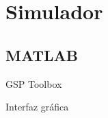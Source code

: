 \documentclass{beamer}
\begin{document}
\section{Simulador}
\subsection{MATLAB}
\begin{frame}{GSP Toolbox}
 
\end{frame}

\begin{frame}{Interfaz gráfica}
 
\end{frame}
\end{document}
